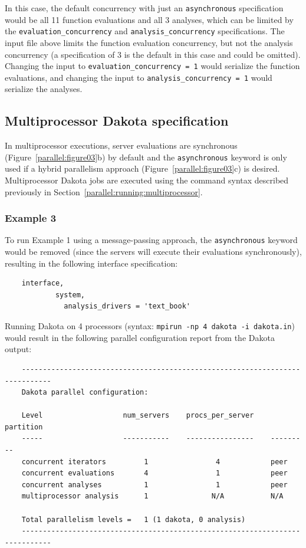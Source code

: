 In this case, the default concurrency with just an
\texttt{asynchronous} specification would be all 11 function
evaluations and all 3 analyses, which can be limited by the
\texttt{evaluation\_concurrency} and \texttt{analysis\_concurrency}
specifications. The input file above limits the function evaluation
concurrency, but not the analysis concurrency (a specification of 3 is
the default in this case and could be omitted). Changing the input to
\texttt{evaluation\_concurrency = 1} would serialize the function
evaluations, and changing the input to \texttt{analysis\_concurrency = 1}
would serialize the analyses.

\subsection{Multiprocessor Dakota specification}\label{parallel:spec:multi}

In multiprocessor executions, server evaluations are synchronous
(Figure~\ref{parallel:figure03}b) by default and the
\texttt{asynchronous} keyword is only used if a hybrid parallelism
approach (Figure~\ref{parallel:figure03}c) is desired. Multiprocessor
Dakota jobs are executed using the command syntax described previously
in Section~\ref{parallel:running:multiprocessor}.

\subsubsection{Example 3}\label{parallel:spec:multi:example3}

To run Example 1 using a message-passing approach, the
\texttt{asynchronous} keyword would be removed (since the servers will
execute their evaluations synchronously), resulting in the following
interface specification:
\begin{small}
\begin{verbatim}
    interface,
            system,
              analysis_drivers = 'text_book'
\end{verbatim}
\end{small}

Running Dakota on 4 processors (syntax: \texttt{mpirun -np 4 dakota -i
  dakota.in}) would result in the following parallel configuration
report from the Dakota output:
\begin{small}
\begin{verbatim}
    -----------------------------------------------------------------------------
    Dakota parallel configuration:

    Level                   num_servers    procs_per_server    partition
    -----                   -----------    ----------------    ---------
    concurrent iterators         1                4            peer
    concurrent evaluations       4                1            peer
    concurrent analyses          1                1            peer
    multiprocessor analysis      1               N/A           N/A

    Total parallelism levels =   1 (1 dakota, 0 analysis)
    -----------------------------------------------------------------------------
\end{verbatim}
\end{small}

